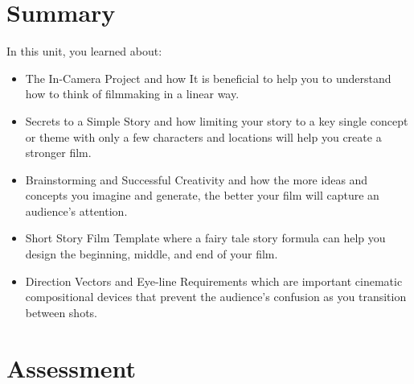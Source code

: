 \documentclass[
]{book}
\begin{document}
\hypertarget{summary-5}{%
\section*{Summary}\label{summary-5}}

In this unit, you learned about:

\begin{itemize}
\item
  The In-Camera Project and how It is beneficial to help you to understand how to think of filmmaking in a linear way.
\item
  Secrets to a Simple Story and how limiting your story to a key single concept or theme with only a few characters and locations will help you create a stronger film.
\item
  Brainstorming and Successful Creativity and how the more ideas and concepts you imagine and generate, the better your film will capture an audience's attention.
\item
  Short Story Film Template where a fairy tale story formula can help you design the beginning, middle, and end of your film.
\item
  Direction Vectors and Eye-line Requirements which are important cinematic compositional devices that prevent the audience's confusion as you transition between shots.
\end{itemize}

\hypertarget{assessment-9}{%
\section*{Assessment}\label{assessment-9}}
\end{document}
